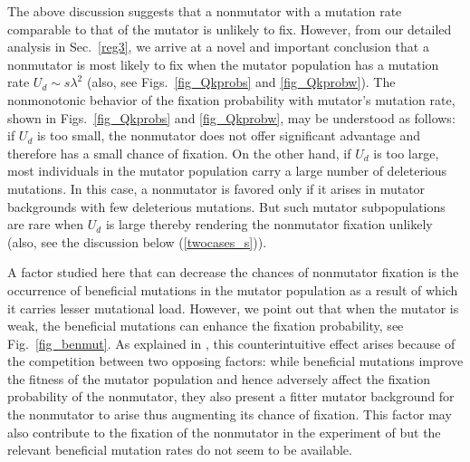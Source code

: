 \documentclass[preprint,12pt,number]{elsarticle}
\begin{document}
The above discussion suggests that a nonmutator with a mutation rate comparable to that of the mutator \citep{Mcdonald:2012,Wielgoss:2013} is  unlikely to fix.  However, from our detailed analysis in Sec.~\ref{reg3}, we arrive at a novel and important conclusion that a nonmutator is most likely to fix when the mutator population has a mutation rate $U_d \sim  s \lambda^2$ (also, see Figs.~\ref{fig_Qkprobs} and \ref{fig_Qkprobw}). 
The nonmonotonic behavior of the fixation probability with mutator's mutation rate, shown in Figs.~\ref{fig_Qkprobs} and \ref{fig_Qkprobw}, may be understood as follows: if $U_d$ is too small, the nonmutator does not offer significant advantage and therefore has a small chance of fixation. On the other hand, if  $U_d$ is too large, most individuals in the mutator population carry a large number of deleterious mutations. In this case, a nonmutator is favored only if it arises in mutator backgrounds with few deleterious mutations. But such mutator subpopulations are rare when $U_d$ is large thereby rendering the nonmutator fixation  unlikely (also, see the discussion below (\ref{twocases_s})). 

A factor studied here that can decrease the chances of nonmutator fixation is the occurrence of beneficial mutations in the mutator population as a result of which it carries lesser mutational load. However, we point out that when the mutator is weak, the beneficial mutations can enhance the fixation probability, see Fig.~\ref{fig_benmut}.  
As explained in \citep{James:2016}, this counterintuitive effect arises because of the competition between two opposing factors: while beneficial mutations  improve the fitness of the mutator population and hence adversely affect the fixation probability of the nonmutator, they also present a fitter mutator background for the nonmutator to arise thus augmenting its chance of fixation. This factor may also contribute to the fixation of the nonmutator in the experiment of  \citep{Wielgoss:2013} but  the relevant beneficial mutation rates do not seem to be available. 
\end{document}
